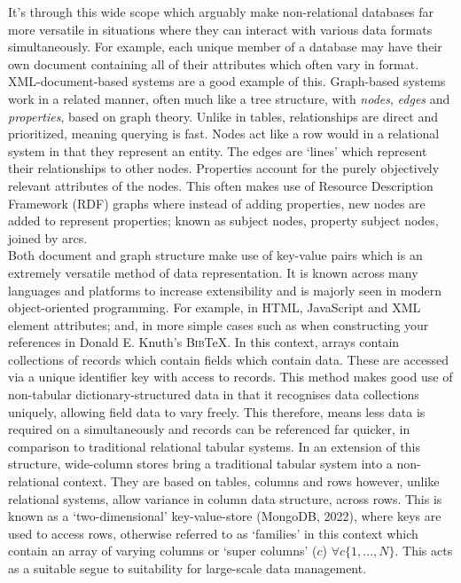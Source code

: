 \documentclass[11pt, english]{article}
\begin{document}
	It's through this wide scope which arguably make non-relational databases far more versatile in situations where they can interact with various data formats simultaneously. For example, each unique member of a database may have their own document containing all of their attributes which often vary in format. XML-document-based systems are a good example of this. Graph-based systems work in a related manner, often much like a tree structure, with \textit{nodes}, \textit{edges} and \textit{properties}, based on graph theory. Unlike in tables, relationships are direct and prioritized, meaning querying is fast. Nodes act like a row would in a relational system in that they represent an entity. The edges are `lines' which represent their relationships to other nodes. Properties account for the purely objectively relevant attributes of the nodes. This often makes use of Resource Description Framework (RDF) graphs where instead of adding properties, new nodes are added to represent properties; known as subject nodes, property subject nodes, joined by arcs.\\

	Both document and graph structure make use of key-value pairs which is an extremely versatile method of data representation. It is known across many languages and platforms to increase extensibility and is majorly seen in modern object-oriented programming. For example, in HTML, JavaScript and XML element attributes; and, in more simple cases such as when constructing your references in Donald E. Knuth's \textsc{Bib}\TeX. In this context, arrays contain collections of records which contain fields which contain data. These are accessed via a unique identifier key with access to records. This method makes good use of non-tabular dictionary-structured data in that it recognises data collections uniquely, allowing field data to vary freely. This therefore, means less data is required on a simultaneously and records can be referenced far quicker, in comparison to traditional relational tabular systems. In an extension of this structure, wide-column stores bring a traditional tabular system into a non-relational context. They are based on tables, columns and rows however, unlike relational systems, allow variance in column data structure, across rows. This is known as a `two-dimensional' key-value-store (MongoDB, 2022), where keys are used to access rows, otherwise referred to as `families' in this context which contain an array of varying columns or `super columns' ($c$) $\forall c\{1,...,N\}$. This acts as a suitable segue to suitability for large-scale data management.
\end{document}
